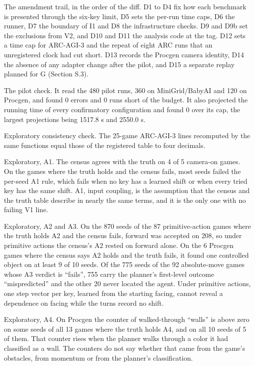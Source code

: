 \documentclass[journal,onecolumn]{IEEEtran}
\begin{document}
The amendment trail, in the order of the diff. D1 to D4 fix how each
benchmark is presented through the six-key limit, D5 sets the per-run
time caps, D6 the runner, D7 the boundary of I1 and D8 the
infrastructure checks. D9 and D9b set the exclusions from V2, and D10
and D11 the analysis code at the tag. D12 sets a time cap for ARC-AGI-3
and the repeat of eight ARC runs that an unregistered clock had cut
short. D13 records the Procgen camera identity, D14 the absence of any
adapter change after the pilot, and D15 a separate replay planned for G
(Section S.3).

The pilot check. It read the 480 pilot runs, 360 on MiniGrid/BabyAI and
120 on Procgen, and found 0 errors and 0 runs short of the budget. It
also projected the running time of every confirmatory configuration and
found 0 over its cap, the largest projections being 1517.8 s and 2550.0
s.

Exploratory consistency check. The 25-game ARC-AGI-3 lines recomputed by
the same functions equal those of the registered table to four decimals.

Exploratory, A1. The census agrees with the truth on 4 of 5 camera-on
games. On the games where the truth holds and the census fails, most
seeds failed the per-seed A1 rule, which fails when no key has a learned
shift or when every tried key has the same shift. A1, input coupling, is
the assumption that the census and the truth table describe in nearly
the same terms, and it is the only one with no failing V1 line.

Exploratory, A2 and A3. On the 870 seeds of the 87 primitive-action
games where the truth holds A2 and the census fails, forward was
accepted on 208, so under primitive actions the census's A2 rested on
forward alone. On the 6 Procgen games where the census says A2 holds and
the truth fails, it found one controlled object on at least 9 of 10
seeds. Of the 775 seeds of the 92 absolute-move games whose A3 verdict
is ``fails'', 755 carry the planner's first-level outcome
``mispredicted'' and the other 20 never located the agent. Under
primitive actions, one step vector per key, learned from the starting
facing, cannot reveal a dependence on facing while the turns record no
shift.

Exploratory, A4. On Procgen the counter of walked-through ``walls'' is
above zero on some seeds of all 13 games where the truth holds A4, and
on all 10 seeds of 5 of them. That counter rises when the planner walks
through a color it had classified as a wall. The counters do not say
whether that came from the game's obstacles, from momentum or from the
planner's classification.
\end{document}

